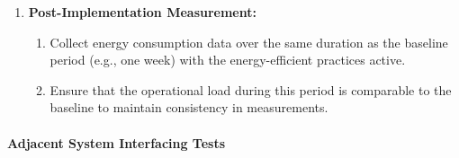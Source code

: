 \documentclass[12pt, titlepage]{article}
\begin{document}
\begin{enumerate}
\begin{enumerate}
    \item \textbf{Post-Implementation Measurement:}
    \begin{enumerate}
        \item Collect energy consumption data over the same duration as the baseline period (e.g., one week) with the energy-efficient practices active.
        \item Ensure that the operational load during this period is comparable to the baseline to maintain consistency in measurements.
    \end{enumerate}
    
\end{enumerate}

\end{enumerate}

\paragraph{Adjacent System Interfacing Tests}
\end{document}
